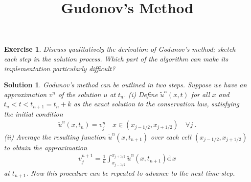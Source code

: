 \documentclass[10pt,letterpaper]{article}
\newcommand{\dif}[1][]{\mathrm{d} {#1}\,}
\newcommand{\frb}[1]{ \left(  {#1} \right) }
\theoremstyle{break}
\newtheorem{exercise}{Exercise}
\newtheorem{solution}{Solution}
\begin{document}
\title{Gudonov's Method}
\date{}

\maketitle








\begin{exercise}
    Discuss qualitatively the derivation of \emph{Godunov's method}; sketch each step in the solution process.
    Which part of the algorithm can make its implementation particularly difficult?
\end{exercise}



\begin{solution}
    Godunov's method can be outlined in two steps.
    Suppose we have an approximation $v^n$ of the solution $u$ at $t_n$.
    (i) Define $\widetilde{u}^{n}(x,t)$ for all $x$ and $t_n<t<t_{n+1}=t_n+k$ as the exact solution to the conservation law, satisfying the initial condition
    \begin{gather} \label{GodIn}
        \widetilde u^n\frb{x,t_n}=v^n_j
        \quad
        x\in(x_{j-1/2},x_{j+1/2})
        \quad\forall j\ .
    \end{gather}
    (ii) Average the resulting function $\widetilde{u}^{n}\frb{x,t_{n+1}}$ over each cell $(x_{j-1/2},x_{j+1/2})$ to obtain the approximation
    \begin{gather} \label{GogAvg}
        v_{j}^{n+1}=\frac{1}{h}\int_{x_{j-1/2}}^{x_{j+1/2}}\tilde{u}^{n}\frb{x,t_{n+1}}\dif x
    \end{gather}
    at $t_{n+1}$.
    Now this procedure can be repeated to advance to the next time-step.


\end{solution}
\end{document}
